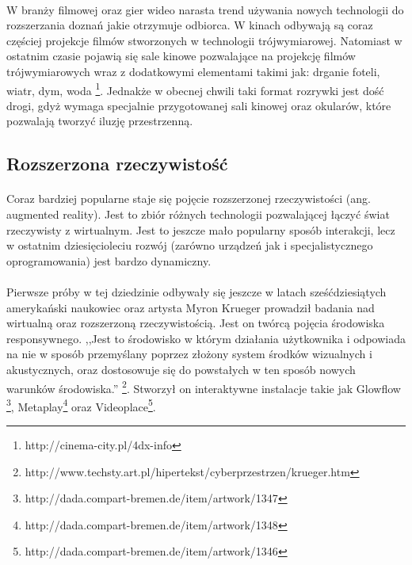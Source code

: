 {{\paragraph{}
W branży filmowej oraz gier wideo narasta trend używania nowych technologii do rozszerzania doznań jakie otrzymuje odbiorca.
W kinach odbywają są coraz częściej projekcje filmów stworzonych w technologii trójwymiarowej. Natomiast w ostatnim czasie pojawią się sale kinowe pozwalające na projekcję filmów trójwymiarowych wraz z dodatkowymi elementami takimi jak: drganie foteli, wiatr, dym, woda \footnote{http://cinema-city.pl/4dx-info}. Jednakże w obecnej chwili taki format rozrywki jest dość drogi, gdyż wymaga specjalnie przygotowanej sali kinowej oraz okularów, które pozwalają tworzyć iluzję przestrzenną. 

\subsection{Rozszerzona rzeczywistość}
\paragraph{}
Coraz bardziej popularne staje się pojęcie rozszerzonej rzeczywistości (ang. augmented reality). Jest to zbiór różnych technologii pozwalającej łączyć świat rzeczywisty z wirtualnym. Jest to jeszcze mało popularny sposób interakcji, lecz w ostatnim dziesięcioleciu rozwój (zarówno urządzeń jak i specjalistycznego oprogramowania) jest bardzo dynamiczny.
\paragraph{}
Pierwsze próby w tej dziedzinie odbywały się jeszcze w latach sześćdziesiątych amerykański naukowiec oraz artysta Myron Krueger prowadził badania nad wirtualną oraz rozszerzoną rzeczywistością. Jest on twórcą pojęcia środowiska responsywnego. ,,Jest to środowisko w którym działania użytkownika i odpowiada na nie w sposób przemyślany poprzez złożony system środków wizualnych i akustycznych, oraz dostosowuje się do powstałych w ten sposób nowych warunków środowiska.'' \footnote{http://www.techsty.art.pl/hipertekst/cyberprzestrzen/krueger.htm}. Stworzył on interaktywne instalacje takie jak Glowflow \footnote{http://dada.compart-bremen.de/item/artwork/1347}, Metaplay\footnote{http://dada.compart-bremen.de/item/artwork/1348} oraz Videoplace\footnote{http://dada.compart-bremen.de/item/artwork/1346}.

}}
